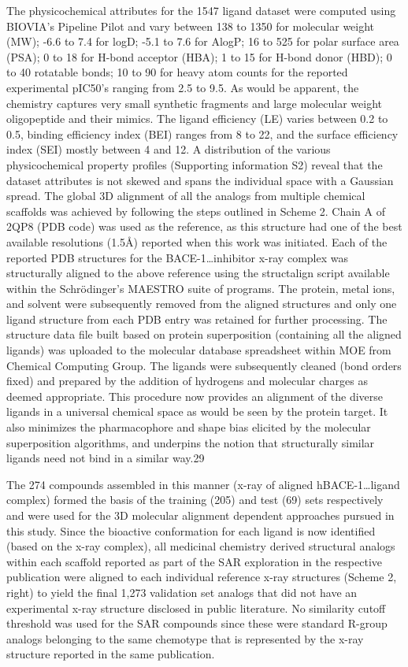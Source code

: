 The physicochemical attributes for the 1547 ligand dataset were computed using BIOVIA’s Pipeline Pilot and vary between 138 to 1350 for molecular weight (MW); -6.6 to 7.4 for logD; -5.1 to 7.6 for AlogP; 16 to 525 for polar surface area (PSA); 0 to 18 for H-bond acceptor (HBA); 1 to 15 for H-bond donor (HBD); 0 to 40 rotatable bonds; 10 to 90 for heavy atom counts for the reported experimental pIC50’s ranging from 2.5 to 9.5.  As would be apparent, the chemistry captures very small synthetic fragments and large molecular weight oligopeptide and their mimics.  The ligand efficiency (LE) varies between 0.2 to 0.5, binding efficiency index (BEI) ranges from 8 to 22, and the surface efficiency index (SEI) mostly between 4 and 12.  A distribution of the various physicochemical property profiles (Supporting information S2) reveal that the dataset attributes is not skewed and spans the individual space with a Gaussian spread.  
The global 3D alignment of all the analogs from multiple chemical scaffolds was achieved by following the steps outlined in Scheme 2.  Chain A of 2QP8 (PDB code) was used as the reference, as this structure had one of the best available resolutions (1.5Å) reported when this work was initiated.  Each of the reported PDB structures for the BACE-1…inhibitor x-ray complex was structurally aligned to the above reference using the structalign script available within the Schrödinger’s MAESTRO suite of programs.  The protein, metal ions, and solvent were subsequently removed from the aligned structures and only one ligand structure from each PDB entry was retained for further processing.  The structure data file built based on protein superposition (containing all the aligned ligands) was uploaded to the molecular database spreadsheet within MOE from Chemical Computing Group.  The ligands were subsequently cleaned (bond orders fixed) and prepared by the addition of hydrogens and molecular charges as deemed appropriate.  This procedure now provides an alignment of the diverse ligands in a universal chemical space as would be seen by the protein target.  It also minimizes the pharmacophore and shape bias elicited by the molecular superposition algorithms, and underpins the notion that structurally similar ligands need not bind in a similar way.29   

The 274 compounds assembled in this manner (x-ray of aligned hBACE-1…ligand complex) formed the basis of the training (205) and test (69) sets respectively and were used for the 3D molecular alignment dependent approaches pursued in this study.  Since the bioactive conformation for each ligand is now identified (based on the x-ray complex), all medicinal chemistry derived structural analogs within each scaffold reported as part of the SAR exploration in the respective publication were aligned to each individual reference x-ray structures (Scheme 2, right) to yield the final 1,273 validation set analogs that did not have an experimental x-ray structure disclosed in public literature.  No similarity cutoff threshold was used for the SAR compounds since these were standard R-group analogs belonging to the same chemotype that is represented by the x-ray structure reported in the same publication.

